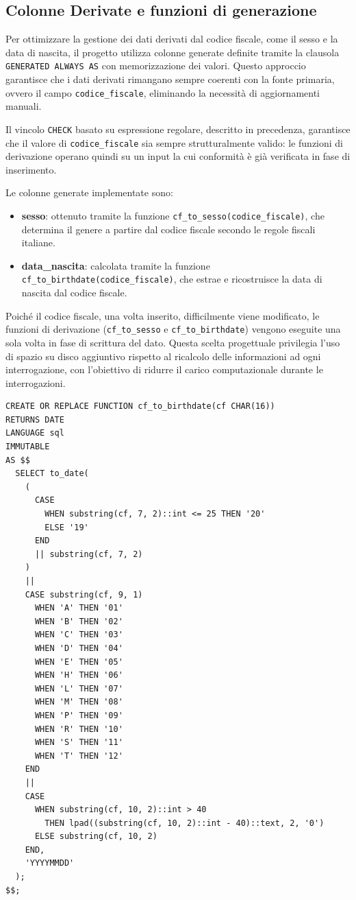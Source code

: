 \documentclass[11pt,a4paper]{article}
\begin{document}
\subsection{Colonne Derivate e funzioni di generazione}

Per ottimizzare la gestione dei dati derivati dal codice fiscale, come il sesso e la data di
nascita, il progetto utilizza colonne generate definite tramite la clausola
\texttt{GENERATED ALWAYS AS} con memorizzazione dei valori. Questo approccio garantisce che i
dati derivati rimangano sempre coerenti con la fonte primaria, ovvero il campo
\texttt{codice\_fiscale}, eliminando la necessità di aggiornamenti manuali.

Il vincolo \texttt{CHECK} basato su espressione regolare, descritto in precedenza, garantisce
che il valore di \texttt{codice\_fiscale} sia sempre strutturalmente valido: le funzioni di
derivazione operano quindi su un input la cui conformità è già verificata in fase di
inserimento.

Le colonne generate implementate sono:

\begin{itemize}[nosep]
  \item \textbf{sesso}: ottenuto tramite la funzione \texttt{cf\_to\_sesso(codice\_fiscale)},
    che determina il genere a partire dal codice fiscale secondo le regole fiscali italiane.
  \item \textbf{data\_nascita}: calcolata tramite la funzione
    \texttt{cf\_to\_birthdate(codice\_fiscale)}, che estrae e ricostruisce la data di nascita
    dal codice fiscale.
\end{itemize}

Poiché il codice fiscale, una volta inserito, difficilmente viene modificato, le funzioni di
derivazione (\texttt{cf\_to\_sesso} e \texttt{cf\_to\_birthdate}) vengono eseguite una sola
volta in fase di scrittura del dato. Questa scelta progettuale privilegia l'uso di spazio su
disco aggiuntivo rispetto al ricalcolo delle informazioni ad ogni interrogazione, con
l'obiettivo di ridurre il carico computazionale durante le interrogazioni.

\begin{verbatim}
CREATE OR REPLACE FUNCTION cf_to_birthdate(cf CHAR(16))
RETURNS DATE
LANGUAGE sql
IMMUTABLE
AS $$
  SELECT to_date(
    (
      CASE
        WHEN substring(cf, 7, 2)::int <= 25 THEN '20'
        ELSE '19'
      END
      || substring(cf, 7, 2)
    )
    ||
    CASE substring(cf, 9, 1)
      WHEN 'A' THEN '01'
      WHEN 'B' THEN '02'
      WHEN 'C' THEN '03'
      WHEN 'D' THEN '04'
      WHEN 'E' THEN '05'
      WHEN 'H' THEN '06'
      WHEN 'L' THEN '07'
      WHEN 'M' THEN '08'
      WHEN 'P' THEN '09'
      WHEN 'R' THEN '10'
      WHEN 'S' THEN '11'
      WHEN 'T' THEN '12'
    END
    ||
    CASE
      WHEN substring(cf, 10, 2)::int > 40
        THEN lpad((substring(cf, 10, 2)::int - 40)::text, 2, '0')
      ELSE substring(cf, 10, 2)
    END,
    'YYYYMMDD'
  );
$$;
\end{verbatim}
\end{document}
